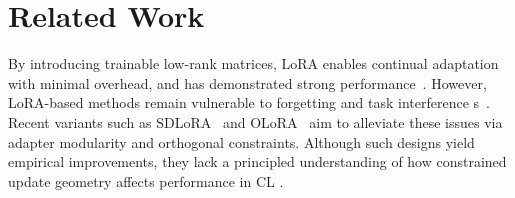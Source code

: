\documentclass{article}
\newcommand{\minisection}[1]{\vspace{0.0in} \noindent {\bf #1}}
\begin{document}

\section{Related Work}

\minisection{LoRA-Based CL.}
By introducing trainable low-rank matrices, LoRA enables continual adaptation with minimal overhead, and has demonstrated strong performance~\cite{hu2022lora}.
However, LoRA-based methods remain vulnerable to forgetting and task interference
s~\cite{Gao_2023_ICCV,10.1145/3730436.3730456,yang2024parametercollisionhinderingcontinual}. 
Recent variants such as SDLoRA~\cite{wu2025sdlorascalabledecoupledlowrank} and OLoRA~\cite{NEURIPS2020_70d85f35,wang2023orthogonal} aim to alleviate these issues via adapter modularity and orthogonal constraints. 
Although such designs yield empirical improvements, they lack a principled understanding of how constrained update geometry affects performance in CL .
\end{document}
